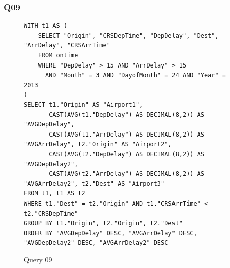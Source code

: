 \subsubsection{Q09}

\begin{figure}[t]
\begin{lstlisting}[frame=single]
WITH t1 AS (
    SELECT "Origin", "CRSDepTime", "DepDelay", "Dest", "ArrDelay", "CRSArrTime"
    FROM ontime
    WHERE "DepDelay" > 15 AND "ArrDelay" > 15
      AND "Month" = 3 AND "DayofMonth" = 24 AND "Year" = 2013
)
SELECT t1."Origin" AS "Airport1",
       CAST(AVG(t1."DepDelay") AS DECIMAL(8,2)) AS "AVGDepDelay",
       CAST(AVG(t1."ArrDelay") AS DECIMAL(8,2)) AS "AVGArrDelay", t2."Origin" AS "Airport2",
       CAST(AVG(t2."DepDelay") AS DECIMAL(8,2)) AS "AVGDepDelay2",
       CAST(AVG(t2."ArrDelay") AS DECIMAL(8,2)) AS "AVGArrDelay2", t2."Dest" AS "Airport3"
FROM t1, t1 AS t2
WHERE t1."Dest" = t2."Origin" AND t1."CRSArrTime" < t2."CRSDepTime"
GROUP BY t1."Origin", t2."Origin", t2."Dest"
ORDER BY "AVGDepDelay" DESC, "AVGArrDelay" DESC, "AVGDepDelay2" DESC, "AVGArrDelay2" DESC
\end{lstlisting}
  \caption{Query 09}
  \label{sel:sql09}
\end{figure}

